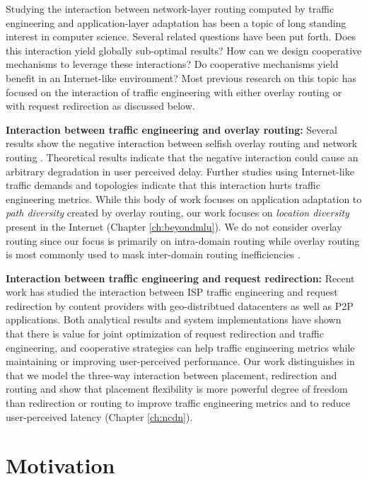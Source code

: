 Studying the interaction between network-layer routing computed by traffic engineering and application-layer adaptation has been a topic of long standing interest in computer science. Several related questions have been put forth. Does this interaction yield globally sub-optimal results? How can we design cooperative mechanisms to leverage these interactions? Do cooperative mechanisms yield benefit in an Internet-like environment? Most previous research on this topic has focused on the interaction of traffic engineering with either overlay routing \cite{Roughgarden,selfishQiu} or with request redirection \cite{Jiang2009,JohariGameTheory, CATE, P4P} as discussed below. 

\textbf{Interaction between traffic engineering and overlay routing:} Several results show the negative interaction between selfish overlay routing and network routing \cite{Roughgarden,selfishQiu}. Theoretical results indicate that the negative interaction could cause an arbitrary degradation in user perceived delay. Further studies using Internet-like traffic demands and topologies indicate that this interaction hurts traffic engineering metrics. While this body of work focuses on application adaptation to \emph{path diversity} created by overlay routing, our work focuses on \emph{location diversity} present in the Internet (Chapter \ref{ch:beyondmlu}). We do not consider overlay routing since our focus is primarily on intra-domain routing while overlay routing is most commonly used to mask inter-domain routing inefficiencies \cite{Detour}. 


\textbf{Interaction between traffic engineering and request redirection:} Recent work has studied the interaction between ISP traffic engineering and request redirection by content providers with geo-distribtued datacenters as well as P2P applications. Both analytical results \cite{Jiang2009,JohariGameTheory} and system implementations \cite{CATE,P4P} have shown that there is value for joint optimization of request redirection and traffic engineering, and cooperative strategies can help traffic engineering metrics while maintaining or improving user-perceived performance. Our work distinguishes in that  we model the three-way interaction between placement, redirection and routing and show that placement flexibility is more powerful degree of freedom than redirection or routing to improve traffic engineering metrics and to reduce user-perceived latency (Chapter \ref{ch:ncdn}).


\section{Motivation}
\label{sec:bg-motivation}

